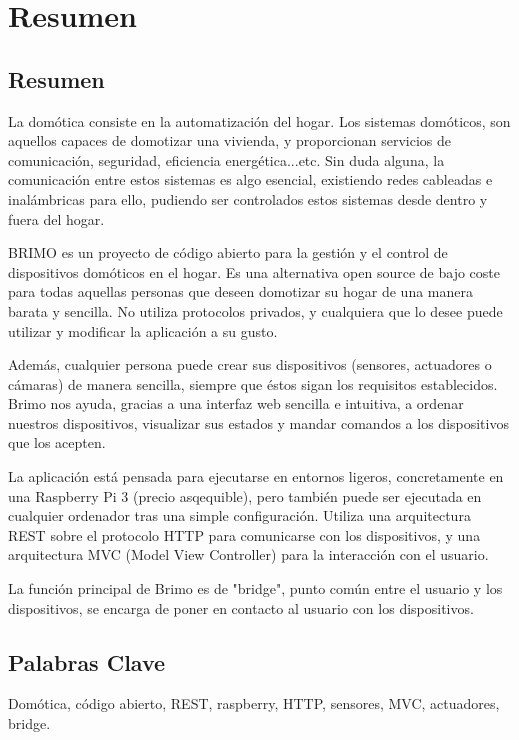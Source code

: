 \chapter*{Resumen}

\section*{Resumen}

La domótica consiste en la automatización del hogar. Los sistemas domóticos, son aquellos capaces de domotizar una vivienda, y proporcionan servicios de comunicación,
seguridad, eficiencia energética...etc. Sin duda alguna, la comunicación entre estos sistemas es algo esencial, existiendo redes cableadas e inalámbricas para ello, pudiendo
ser controlados estos sistemas desde dentro y fuera del hogar.

BRIMO es un proyecto de código abierto para la gestión y el control de dispositivos domóticos en el hogar. Es una alternativa open source de bajo coste para todas
aquellas personas que deseen domotizar su hogar de una manera barata y sencilla. No utiliza protocolos privados, y cualquiera que lo desee puede utilizar y modificar
la aplicación a su gusto.

Además, cualquier persona puede crear sus dispositivos (sensores, actuadores o cámaras) de manera sencilla, siempre que éstos sigan los requisitos establecidos.
Brimo nos ayuda, gracias a una interfaz web sencilla e intuitiva, a ordenar nuestros dispositivos, visualizar sus estados y mandar comandos a los dispositivos que los acepten.

La aplicación está pensada para ejecutarse en entornos ligeros, concretamente en una Raspberry Pi 3 (precio asqequible), pero también puede ser ejecutada en cualquier ordenador tras una simple configuración.
Utiliza una arquitectura REST sobre el protocolo HTTP para comunicarse con los dispositivos, y una arquitectura MVC (Model View Controller) para la interacción con el usuario.

La función principal de Brimo es de "bridge", punto común entre el usuario y los dispositivos, se encarga de poner en contacto al usuario con los dispositivos.
\section*{Palabras Clave}
Domótica, código abierto, REST, raspberry, HTTP, sensores, MVC, actuadores, bridge.
\newpage


